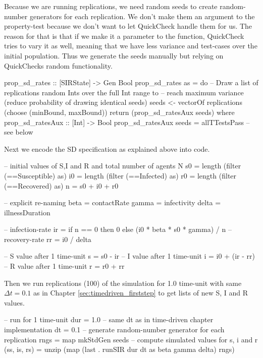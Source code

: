 Because we are running replications, we need random seeds to create random-number generators for each replication. We don't make them an argument to the property-test because we don't want to let QuickCheck handle them for us. The reason for that is that if we make it a parameter to the function, QuickCheck tries to vary it as well, meaning that we have less variance and test-cases over the initial population. Thus we generate the seeds manually but relying on QuickChecks random functionality.

\begin{HaskellCode}
prop_sd_rates :: [SIRState] -> Gen Bool
prop_sd_rates as = do
    -- Draw a list of replications random Ints over the full Int range to  
    -- reach maximum variance (reduce probability of drawing identical seeds)
    seeds <- vectorOf replications (choose (minBound, maxBound))
    return (prop_sd_ratesAux seeds)
  where
    prop_sd_ratesAux :: [Int] -> Bool
    prop_sd_ratesAux seeds = allTTestsPass -- see below
\end{HaskellCode}

Next we encode the SD specification as explained above into code.

\begin{HaskellCode}
-- initial values of S,I and R and total number of agents N
s0 = length (filter (==Susceptible) as)
i0 = length (filter (==Infected) as)
r0 = length (filter (==Recovered) as)
n  = s0 + i0 + r0

-- explicit re-naming
beta  = contactRate
gamma = infectivity
delta = illnessDuration

-- infection-rate
ir = if n == 0 then 0 else (i0 * beta * s0 * gamma) / n
-- recovery-rate 
rr = i0 / delta

-- S value after 1 time-unit 
s = s0 - ir
-- I value after 1 time-unit
i = i0 + (ir - rr)
-- R value after 1 time-unit
r = r0 + rr
\end{HaskellCode}

Then we run replications (100) of the simulation for 1.0 time-unit with same $\Delta t = 0.1$ as in Chapter \ref{sec:timedriven_firststep} to get lists of new S, I and R values.

\begin{HaskellCode}
-- run for 1 time-unit
dur = 1.0
-- same dt as in time-driven chapter implementation
dt = 0.1
-- generate random-number generator for each replication
rngs = map mkStdGen seeds
-- compute simulated values for s, i and r
(ss, is, rs) = unzip (map (last . runSIR dur dt as beta gamma delta) rngs)
\end{HaskellCode}

